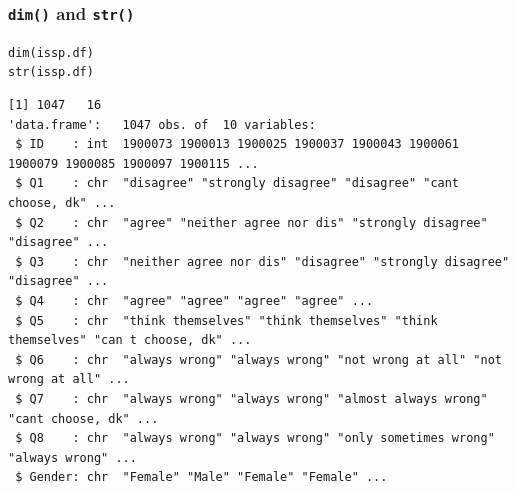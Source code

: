 \documentclass[handout]{beamer}\usepackage[]{graphicx}\usepackage[]{color}
\makeatletter
\newcommand{\hlstd}[1]{\textcolor[rgb]{0,0,0}{#1}}%
\newcommand{\hlkwd}[1]{\textcolor[rgb]{0,0.267,0.4}{#1}}%
\newenvironment{kframe}{%
 \def\at@end@of@kframe{}%
 \ifinner\ifhmode%
  \def\at@end@of@kframe{\end{minipage}}%
  \begin{minipage}{\columnwidth}%
 \fi\fi%
 \def\FrameCommand##1{\hskip\@totalleftmargin \hskip-\fboxsep
 \colorbox{shadecolor}{##1}\hskip-\fboxsep
     \hskip-\linewidth \hskip-\@totalleftmargin \hskip\columnwidth}%
 \MakeFramed {\advance\hsize-\width
   \@totalleftmargin\z@ \linewidth\hsize
   \@setminipage}}%
 {\par\unskip\endMakeFramed%
 \at@end@of@kframe}
\newenvironment{knitrout}{}{} %
\makeatother
\begin{document}
\begin{frame}[fragile]
\frametitle{\texttt{dim()} and \texttt{str()}}
\begin{knitrout}
\color{fgcolor}\begin{kframe}
\begin{alltt}
\hlkwd{dim}\hlstd{(issp.df)}
\hlkwd{str}\hlstd{(issp.df)}
\end{alltt}
\end{kframe}
\end{knitrout}
\begin{knitrout}\small
{}\color{fgcolor}\begin{kframe}
\begin{verbatim}
[1] 1047   16
'data.frame':	1047 obs. of  10 variables:
 $ ID    : int  1900073 1900013 1900025 1900037 1900043 1900061 1900079 1900085 1900097 1900115 ...
 $ Q1    : chr  "disagree" "strongly disagree" "disagree" "cant choose, dk" ...
 $ Q2    : chr  "agree" "neither agree nor dis" "strongly disagree" "disagree" ...
 $ Q3    : chr  "neither agree nor dis" "disagree" "strongly disagree" "disagree" ...
 $ Q4    : chr  "agree" "agree" "agree" "agree" ...
 $ Q5    : chr  "think themselves" "think themselves" "think themselves" "can t choose, dk" ...
 $ Q6    : chr  "always wrong" "always wrong" "not wrong at all" "not wrong at all" ...
 $ Q7    : chr  "always wrong" "always wrong" "almost always wrong" "cant choose, dk" ...
 $ Q8    : chr  "always wrong" "always wrong" "only sometimes wrong" "always wrong" ...
 $ Gender: chr  "Female" "Male" "Female" "Female" ...
\end{verbatim}
\end{kframe}
\end{knitrout}
\end{frame}
\end{document}
